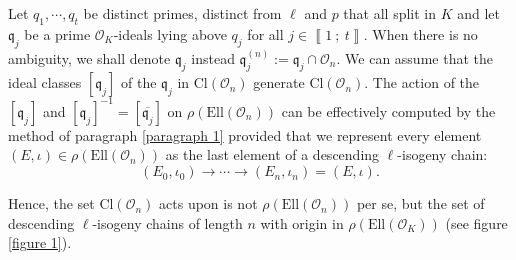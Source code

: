 \documentclass[a4paper,10pt]{report}
\theoremstyle{definition}
\theoremstyle{plain}
\theoremstyle{definition}
\newcommand{\mO}{\mathcal{O}}
\renewcommand{\i}[2]{\left\llbracket #1~;~#2\right\rrbracket}
\renewcommand{\(}{\left(}
\renewcommand{\)}{\right)}
\newcommand{\mfq}{\mathfrak{q}}
\begin{document}
Let $q_1, \cdots,q_t$ be distinct primes, distinct from $\ell$ and $p$ that all split in $K$ and let $\mfq_j$ be a prime $\mO_K$-ideals lying above $q_j$ for all $j\in\i{1}{t}$.  When there is no ambiguity, we shall denote $\mfq_j$ instead $\mfq_j^{(n)}:=\mfq_j\cap\mO_n$.  We can assume that the ideal classes $[\mfq_j]$ of the $\mfq_j$ in $\mbox{Cl}(\mO_n)$ generate $\mbox{Cl}(\mO_n)$.  The action of the $[\mfq_j]$ and $[\mfq_j]^{-1}=[\overline{\mfq_j}]$ on $\rho(\mbox{Ell}(\mO_n))$ can be effectively computed by the method of paragraph \ref{paragraph 1} provided that we represent every element $(E,\iota)\in\rho(\mbox{Ell}(\mO_n))$ as the last element of a descending $\ell$-isogeny chain:
\[(E_0,\iota_0)\longrightarrow\cdots\longrightarrow (E_n,\iota_n)=(E,\iota).\]

Hence, the set $\mbox{Cl}(\mO_n)$ acts upon is not $\rho(\mbox{Ell}(\mO_n))$ per se, but the set of  descending $\ell$-isogeny chains of length $n$ with origin in $\rho(\mbox{Ell}(\mO_K))$ (see figure \ref{figure 1}).

\end{document}
